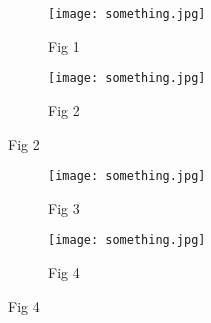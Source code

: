 \documentclass{memoir}
\begin{document}
\begin{figure}%
  \caption{My Figure}
    \begin{subfigure}{\textwidth}
        \caption{Fig 1}
        \texttt{[image: something.jpg]}
    \end{subfigure}
    \begin{subfigure}{\textwidth}
        \caption{Fig 2}
        \texttt{[image: something.jpg]}
    \end{subfigure}
\end{figure}
\clearpage
\begin{figure}%
    \ContinuedFloat %
    \begin{subfigure}{\textwidth}
       \caption{Fig 3}
        \texttt{[image: something.jpg]}
    \end{subfigure}
    \begin{subfigure}{\textwidth}
        \caption{Fig 4}
        \texttt{[image: something.jpg]}
    \end{subfigure}
\end{figure}
\end{document}
